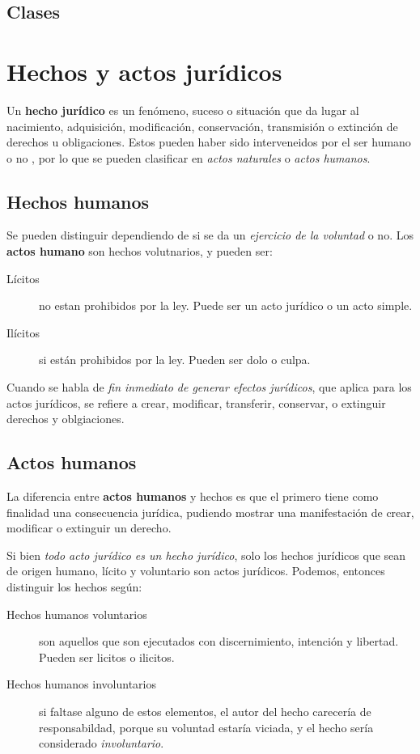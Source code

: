 \documentclass[../resumen.tex]{subfiles}
\begin{document}
\subsection{Clases}

\section{Hechos y actos jurídicos}

Un \textbf{hecho jurídico} es un fenómeno, suceso o situación que da lugar al
nacimiento, adquisición, modificación, conservación, transmisión o extinción de
derechos u obligaciones. Estos pueden haber sido interveneidos por el ser humano
o no , por lo que se pueden clasificar en \textit{actos naturales} o \textit{actos humanos}.

\subsection{Hechos humanos}

Se pueden distinguir dependiendo de si se da un \textit{ejercicio de la voluntad}
o no. Los \textbf{actos humano} son hechos volutnarios, y pueden ser:

\begin{description}
  \item[Lícitos] no estan prohibidos por la ley. Puede ser un acto jurídico o un
    acto simple.
  \item[Ilícitos] si están prohibidos por la ley. Pueden ser dolo o culpa.
\end{description}

Cuando se habla de \textit{fin inmediato de generar efectos jurídicos}, que aplica
para los actos jurídicos, se refiere a crear, modificar, transferir, conservar,
o extinguir derechos y oblgiaciones.

\subsection{Actos humanos}
La diferencia entre \textbf{actos humanos} y hechos es que el primero tiene como 
finalidad una consecuencia jurídica, pudiendo mostrar una manifestación de crear,
modificar o extinguir un derecho.

Si bien \textit{todo acto jurídico es un hecho jurídico}, solo los hechos jurídicos
que sean de origen humano, lícito y voluntario son actos jurídicos. Podemos, entonces
distinguir los hechos según:

\begin{description}
  \item[Hechos humanos voluntarios] son aquellos que son ejecutados con discernimiento,
    intención y libertad. Pueden ser licitos o ilicitos.
  \item[Hechos humanos involuntarios] si faltase alguno de estos elementos, el 
    autor del hecho carecería de responsabildad, porque su voluntad estaría viciada,
    y el hecho sería considerado \textit{involuntario}.
\end{description}
\end{document}
